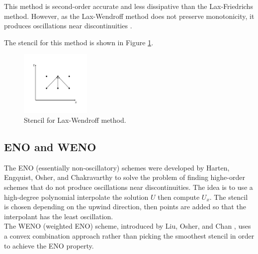 \documentclass[letterpaper]{article}
\begin{document}
This method is second-order accurate and less dissipative than the Lax-Friedrichs method.  However, as the Lax-Wendroff method does not preserve monotonicity, it produces oscillations near discontinuities \cite{LeVequetext}. 

The stencil for this method is shown in Figure 
\ref{fig:stencil_laxwend}. \\

\begin{figure}[H]
\centering
\includegraphics[trim = 10mm 20mm 10mm 15mm, width=0.3\textwidth]{Laxwend.png}
\caption{Stencil for Lax-Wendroff method.}
\label{fig:stencil_laxwend}
\end{figure}


\subsection{ENO and WENO}

The ENO (essentially non-oscillatory) schemes were developed by Harten, Engquist, Osher, and Chakravarthy to solve the problem of finding highe-order schemes that do not produce oscillations near discontinuities. The idea is to use a high-degree polynomial interpolate the solution $U$ then compute $U_x$. The stencil is chosen depending on the upwind direction, then points are added so that the interpolant has the least oscillation. \\

The WENO (weighted ENO) scheme, introduced by Liu, Osher, and Chan \cite{WENO}, uses a convex combination approach rather than picking the smoothest stencil in order to achieve the ENO property. 





\end{document}
